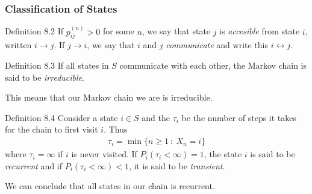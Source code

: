 \subsubsection{Classification of States}
\begin{boks}{Definition 8.2}
  If $p_{ij}^{(n)} > 0$ for some $n$, we say that state $j$ is \textit{accesible} from state $i$, written $i \rightarrow j$. If $j \rightarrow i$, we say that $i$ and $j$ \textit{communicate} and write this $i \leftrightarrow j$.
\end{boks}
\begin{boks}{Definition 8.3}
  If all states in $S$ communicate with each other, the Markov chain is said to be \textit{irreducible}.
\end{boks}
This means that our Markov chain we are is irreducible.
\begin{boks}{Definition 8.4}
  Consider a state $i \in S$ and the $\tau_i$ be the number of steps it takes for the chain to first visit $i$. Thus
  \begin{align*}
    \tau_i = \min \{ n \geq 1 \ : \ X_n = i \}
  \end{align*}
  where $\tau_i = \infty$ if $i$ is never visited. If $P_i(\tau_i < \infty) = 1$, the state $i$ is said to be \textit{recurrent} and if $P_i(\tau_i < \infty) < 1$, it is said to be \textit{transient}.
\end{boks}
We can conclude that all states in our chain is recurrent.

